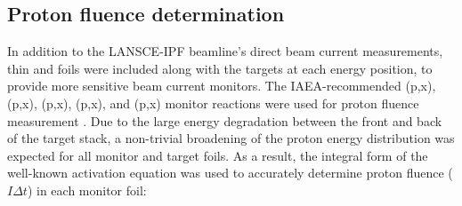 \documentclass[3p]{elsarticle}
\newcommand{\pp}[1]{\left( #1\right)}
\newcommand{\comment}[1]{\todo[color=blue!20!white,inline]{ASV: #1}}
\begin{document}


\subsection{Proton fluence determination}\label{sec:dosimetry}


% 
% 
% 
In addition to the LANSCE-IPF beamline's direct beam current measurements, thin  and  foils were included along with the  targets at each energy position, to provide more sensitive beam current monitors.
The IAEA-recommended (p,x), (p,x), (p,x), (p,x), and (p,x) monitor reactions were used for  proton fluence measurement \cite{gul2001charged}.
Due to the large energy degradation between the front and  back of the target stack, a non-trivial broadening of the proton energy distribution was expected for all monitor and target foils.
As a result, the integral form of the well-known activation equation was used to accurately determine proton fluence ($I \Delta t $) in each monitor foil:
\end{document}
